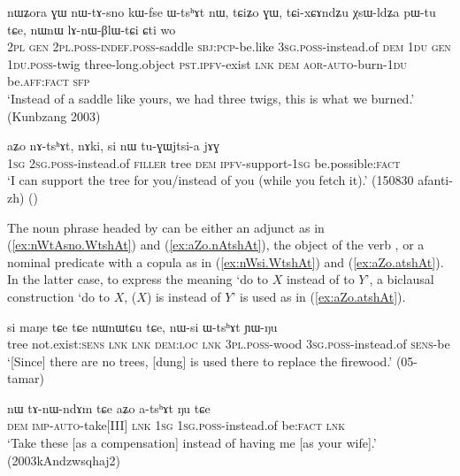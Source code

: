 \begin{exe}
\ex \label{ex:nWtAsno.WtshAt}
\gll nɯʑora ɣɯ nɯ-tɤ-sno kɯ-fse ɯ-tsʰɤt nɯ, tɕiʑo ɣɯ, tɕi-xɕɤndʑu χsɯ-ldʑa pɯ-tu tɕe, nɯnɯ lɤ-nɯ-βlɯ-tɕi ɕti wo \\
\textsc{2pl} \textsc{gen} \textsc{2pl}.\textsc{poss}-\textsc{indef}.\textsc{poss}-saddle \textsc{sbj}:\textsc{pcp}-be.like \textsc{3sg}.\textsc{poss}-instead.of \textsc{dem} \textsc{1du} \textsc{gen} \textsc{1du}.\textsc{poss}-twig three-long.object \textsc{pst}.\textsc{ipfv}-exist \textsc{lnk} \textsc{dem} \textsc{aor}-\textsc{auto}-burn-\textsc{1du} be.\textsc{aff}:\textsc{fact} \textsc{sfp} \\
\glt `Instead of a saddle like yours, we had three twigs, this is what we burned.' (Kunbzang 2003)
\end{exe}

\begin{exe}
\ex \label{ex:aZo.nAtshAt}
\gll aʑo nɤ-tsʰɤt, nɤki, si nɯ tu-ɣɯjtsi-a jɤɣ \\
\textsc{1sg} \textsc{2sg}.\textsc{poss}-instead.of \textsc{filler} tree \textsc{dem} \textsc{ipfv}-support-\textsc{1sg} be.possible:\textsc{fact} \\
\glt `I can support the tree for you/instead of you (while you fetch it).' (150830 afanti-zh)
()
\end{exe}

 The noun phrase headed by  can be either an adjunct as in (\ref{ex:nWtAsno.WtshAt}) and (\ref{ex:aZo.nAtshAt}), the object of the verb , or a nominal predicate with a copula as in (\ref{ex:nWsi.WtshAt}) and (\ref{ex:aZo.atshAt}).  In the latter case, to express the meaning `do to $X$ instead of to $Y$', a biclausal construction `do to $X$, ($X$) is instead of $Y$' is used as in (\ref{ex:aZo.atshAt}).

\begin{exe}
\ex \label{ex:nWsi.WtshAt}
\gll si maŋe tɕe tɕe nɯnɯtɕu tɕe, nɯ-si ɯ-tsʰɤt ɲɯ-ŋu  \\
tree not.exist:\textsc{sens} \textsc{lnk} \textsc{lnk} \textsc{dem}:\textsc{loc} \textsc{lnk} \textsc{3pl}.\textsc{poss}-wood \textsc{3sg}.\textsc{poss}-instead.of \textsc{sens}-be \\
\glt `[Since] there are no trees, [dung] is used there to replace the firewood.' (05-tamar)
\end{exe}


\begin{exe}
\ex \label{ex:aZo.atshAt}
\gll nɯ tɤ-nɯ-ndɤm tɕe aʑo a-tsʰɤt ŋu tɕe \\
\textsc{dem} \textsc{imp}-\textsc{auto}-take[III] \textsc{lnk} \textsc{1sg} \textsc{1sg}.\textsc{poss}-instead.of be:\textsc{fact} \textsc{lnk} \\
\glt `Take these [as a compensation] instead of having me [as your wife].' (2003kAndzwsqhaj2)
\end{exe}

